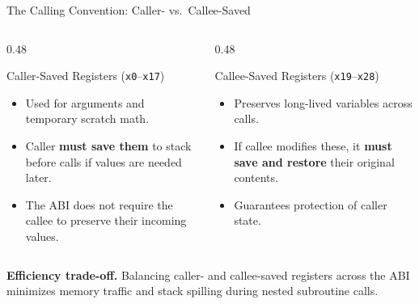 \documentclass[aspectratio=169,11pt,t,xcolor=table]{beamer}
\newcommand{\key}[1]{\textbf{#1}}
\begin{document}
\begin{frame}{The Calling Convention: Caller- vs.\ Callee-Saved}
\vfill
\begin{columns}[T]
\begin{column}{0.48\textwidth}
\begin{block}{Caller-Saved Registers (\texttt{x0}--\texttt{x17})}
\small
\begin{itemize}\setlength{\itemsep}{3pt}
  \item Used for arguments and temporary scratch math.
  \item Caller \key{must save them} to stack before calls if values are needed later.
  \item The ABI does not require the callee to preserve their incoming values.
\end{itemize}
\end{block}
\end{column}

\begin{column}{0.48\textwidth}
\begin{block}{Callee-Saved Registers (\texttt{x19}--\texttt{x28})}
\small
\begin{itemize}\setlength{\itemsep}{3pt}
  \item Preserves long-lived variables across calls.
  \item If callee modifies these, it \key{must save and restore} their original contents.
  \item Guarantees protection of caller state.
\end{itemize}
\end{block}
\end{column}
\end{columns}

\vfill
\small
\textbf{Efficiency trade-off.} Balancing caller- and callee-saved registers across the ABI minimizes memory traffic and stack spilling during nested subroutine calls.
\vfill
\end{frame}









\end{document}

